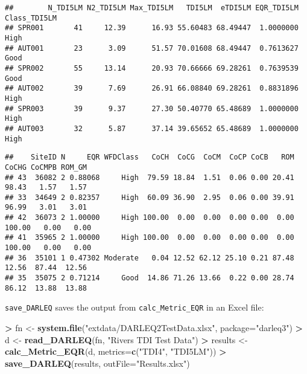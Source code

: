 \documentclass[]{article}
\newenvironment{Shaded}{\begin{snugshade}}{\end{snugshade}}
\newcommand{\KeywordTok}[1]{\textcolor[rgb]{0.13,0.29,0.53}{\textbf{#1}}}
\newcommand{\DataTypeTok}[1]{\textcolor[rgb]{0.13,0.29,0.53}{#1}}
\newcommand{\StringTok}[1]{\textcolor[rgb]{0.31,0.60,0.02}{#1}}
\newcommand{\OperatorTok}[1]{\textcolor[rgb]{0.81,0.36,0.00}{\textbf{#1}}}
\newcommand{\NormalTok}[1]{#1}
\begin{document}
\begin{verbatim}
##        N_TDI5LM N2_TDI5LM Max_TDI5LM   TDI5LM  eTDI5LM EQR_TDI5LM Class_TDI5LM
## SPR001       41     12.39      16.93 55.60483 68.49447  1.0000000         High
## AUT001       23      3.09      51.57 70.01608 68.49447  0.7613627         Good
## SPR002       55     13.14      20.93 70.66666 69.28261  0.7639539         Good
## AUT002       39      7.69      26.91 66.08840 69.28261  0.8831896         High
## SPR003       39      9.37      27.30 50.40770 65.48689  1.0000000         High
## AUT003       32      5.87      37.14 39.65652 65.48689  1.0000000         High
\end{verbatim}

\begin{Shaded}
\end{Shaded}

\begin{verbatim}
##    SiteID N     EQR WFDClass   CoCH  CoCG  CoCM  CoCP CoCB   ROM  CoCHG CoCMPB ROM_GM
## 43  36082 2 0.88068     High  79.59 18.84  1.51  0.06 0.00 20.41  98.43   1.57   1.57
## 33  34649 2 0.82357     High  60.09 36.90  2.95  0.06 0.00 39.91  96.99   3.01   3.01
## 42  36073 2 1.00000     High 100.00  0.00  0.00  0.00 0.00  0.00 100.00   0.00   0.00
## 41  35965 2 1.00000     High 100.00  0.00  0.00  0.00 0.00  0.00 100.00   0.00   0.00
## 36  35101 1 0.47302 Moderate   0.04 12.52 62.12 25.10 0.21 87.48  12.56  87.44  12.56
## 35  35075 2 0.71214     Good  14.86 71.26 13.66  0.22 0.00 28.74  86.12  13.88  13.88
\end{verbatim}

\texttt{save\_DARLEQ} saves the output from \texttt{calc\_Metric\_EQR}
in an Excel file:

\begin{Shaded}
\begin{Highlighting}[]
\OperatorTok{>}\StringTok{ }\NormalTok{fn <-}\StringTok{ }\KeywordTok{system.file}\NormalTok{(}\StringTok{"extdata/DARLEQ2TestData.xlsx"}\NormalTok{, }\DataTypeTok{package=}\StringTok{"darleq3"}\NormalTok{)}
\OperatorTok{>}\StringTok{ }\NormalTok{d <-}\StringTok{ }\KeywordTok{read_DARLEQ}\NormalTok{(fn, }\StringTok{"Rivers TDI Test Data"}\NormalTok{)}
\OperatorTok{>}\StringTok{ }\NormalTok{results <-}\StringTok{ }\KeywordTok{calc_Metric_EQR}\NormalTok{(d, }\DataTypeTok{metrics=}\KeywordTok{c}\NormalTok{(}\StringTok{"TDI4"}\NormalTok{, }\StringTok{"TDI5LM"}\NormalTok{))}
\OperatorTok{>}\StringTok{ }\KeywordTok{save_DARLEQ}\NormalTok{(results, }\DataTypeTok{outFile=}\StringTok{"Results.xlsx"}\NormalTok{)}
\end{Highlighting}
\end{Shaded}
\end{document}
